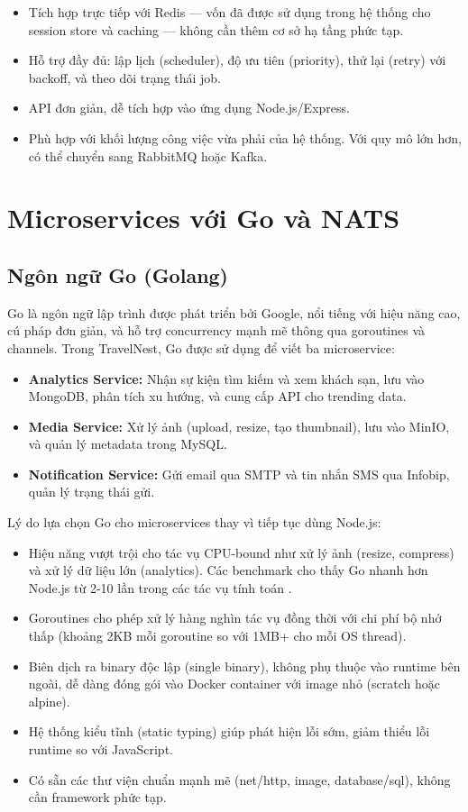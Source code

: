\documentclass[13pt,a4paper,twoside]{report}
\begin{document}
\begin{itemize}
  \item Tích hợp trực tiếp với Redis --- vốn đã được sử dụng trong hệ thống cho session store và caching --- không cần thêm cơ sở hạ tầng phức tạp.
  \item Hỗ trợ đầy đủ: lập lịch (scheduler), độ ưu tiên (priority), thử lại (retry) với backoff, và theo dõi trạng thái job.
  \item API đơn giản, dễ tích hợp vào ứng dụng Node.js/Express.
  \item Phù hợp với khối lượng công việc vừa phải của hệ thống. Với quy mô lớn hơn, có thể chuyển sang RabbitMQ hoặc Kafka.
\end{itemize}

\section{Microservices với Go và NATS}

\subsection{Ngôn ngữ Go (Golang)}

Go là ngôn ngữ lập trình được phát triển bởi Google, nổi tiếng với hiệu năng cao, cú pháp đơn giản, và hỗ trợ concurrency mạnh mẽ thông qua goroutines và channels. Trong TravelNest, Go được sử dụng để viết ba microservice:

\begin{itemize}
  \item \textbf{Analytics Service:} Nhận sự kiện tìm kiếm và xem khách sạn, lưu vào MongoDB, phân tích xu hướng, và cung cấp API cho trending data.
  \item \textbf{Media Service:} Xử lý ảnh (upload, resize, tạo thumbnail), lưu vào MinIO, và quản lý metadata trong MySQL.
  \item \textbf{Notification Service:} Gửi email qua SMTP và tin nhắn SMS qua Infobip, quản lý trạng thái gửi.
\end{itemize}

Lý do lựa chọn Go cho microservices thay vì tiếp tục dùng Node.js:

\begin{itemize}
  \item Hiệu năng vượt trội cho tác vụ CPU-bound như xử lý ảnh (resize, compress) và xử lý dữ liệu lớn (analytics). Các benchmark cho thấy Go nhanh hơn Node.js từ 2-10 lần trong các tác vụ tính toán \cite{donovan2015go}.
  \item Goroutines cho phép xử lý hàng nghìn tác vụ đồng thời với chi phí bộ nhớ thấp (khoảng 2KB mỗi goroutine so với 1MB+ cho mỗi OS thread).
  \item Biên dịch ra binary độc lập (single binary), không phụ thuộc vào runtime bên ngoài, dễ dàng đóng gói vào Docker container với image nhỏ (scratch hoặc alpine).
  \item Hệ thống kiểu tĩnh (static typing) giúp phát hiện lỗi sớm, giảm thiểu lỗi runtime so với JavaScript.
  \item Có sẵn các thư viện chuẩn mạnh mẽ (net/http, image, database/sql), không cần framework phức tạp.
\end{itemize}
\end{document}
